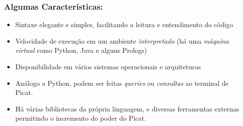 
\begin{frame}[fragile]
    \frametitle{Algumas Características:}

    \begin{itemize}
    
    \pause 
      \item Sintaxe elegante e simples, facilitando a leitura e entendimento do código
      
          \pause 
      \item Velocidade de execução em um ambiente \textit{interpretado} (há
      uma \textit{máquina
      virtual} como Python, Java e alguns Prologs)
      
          \pause 
      \item Disponibilidade em vários sistemas operacionais e arquiteturas
      
      \pause 
      \item Análogo a Python, podem ser feitas \textit{queries}
      ou \textit{consultas} ao terminal de Picat.

      \pause 
      \item Há várias bibliotecas da própria linguagem, e diversas ferramentas
      externas permitindo o incremento do poder do Picat.
      
    \end{itemize}
\end{frame}



